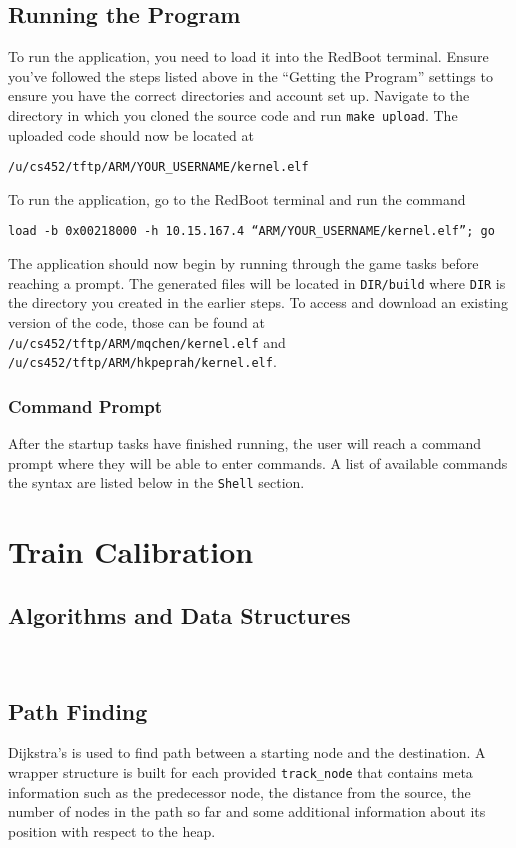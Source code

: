 \documentclass[12pt]{article}
\begin{document}
\subsection{Running the Program}
To run the application, you need to load it into the RedBoot terminal.  Ensure you've followed the steps listed above in the ``Getting the Program'' settings to ensure you have the correct directories and account set up.  Navigate to the directory in which you cloned the source code and run \texttt{make upload}.  The uploaded code should now be located at
\begin{center}
  \texttt{/u/cs452/tftp/ARM/YOUR\_USERNAME/kernel.elf}
\end{center}
To run the application, go to the RedBoot terminal and run the command
\begin{center}
  \texttt{load -b 0x00218000 -h 10.15.167.4 ``ARM/YOUR\_USERNAME/kernel.elf''; go}
\end{center}
The application should now begin by running through the game tasks before reaching a prompt.  The generated files will be located in \texttt{DIR/build} where \texttt{DIR} is the directory you created in the earlier steps.  To access and download an existing version of the code, those can be found at \texttt{/u/cs452/tftp/ARM/mqchen/kernel.elf} and \texttt{/u/cs452/tftp/ARM/hkpeprah/kernel.elf}.
\\
\subsubsection{Command Prompt}
After the startup tasks have finished running, the user will reach a command prompt where they will be able to enter commands.  A list of available commands the syntax are listed below in the \texttt{Shell} section.
\\[2\baselineskip]
\section{Train Calibration}
\subsection{Algorithms and Data Structures}
\\[1\baselineskip]
\subsection{Path Finding}
Dijkstra's is used to find path between a starting node and the destination. A wrapper structure is built for each
provided \texttt{track\_node} that contains meta information such as the predecessor node, the distance from the source,
the number of nodes in the path so far and some additional information about its position with respect to the heap.
\end{document}
